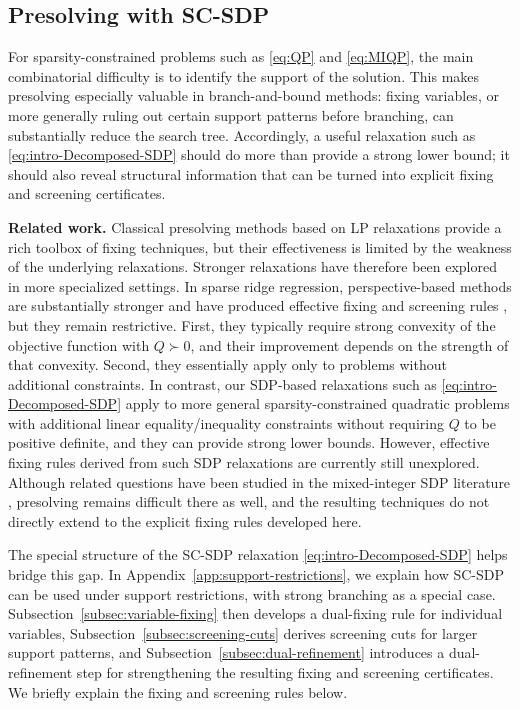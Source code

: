 \documentclass[11pt]{article}
\def\tb#1{\textbf{#1}}
\theoremstyle{plain}
\begin{document}
\subsection{Presolving with SC-SDP}


For sparsity-constrained problems such as \eqref{eq:QP} and \eqref{eq:MIQP}, the main combinatorial difficulty is to identify the support of the solution. This makes presolving especially valuable in branch-and-bound methods: fixing variables, or more generally ruling out 
certain support patterns before branching, can substantially reduce the search tree. Accordingly, a useful relaxation such as \eqref{eq:intro-Decomposed-SDP} should do more than provide a strong lower bound; it should also reveal structural information that can be turned into explicit fixing and screening certificates.

\medskip
\noindent\tb{Related work.}
Classical presolving methods based on LP relaxations \cite{achterberg2020presolve,gamrath2015progress} provide a rich toolbox of fixing techniques, but their effectiveness is limited by the weakness of the underlying relaxations. Stronger relaxations have therefore been explored in more specialized settings. In sparse ridge regression, perspective-based methods are substantially stronger and have produced effective fixing and screening rules \cite{atamturk2020safe,tan2025screening}, but they remain restrictive.
First, they typically require strong convexity of the objective function with $Q\succ 0$, and their improvement depends on the strength of that convexity. Second, they essentially apply only to problems without additional constraints. In contrast, our SDP-based relaxations such as \eqref{eq:intro-Decomposed-SDP} apply to more general sparsity-constrained quadratic problems 
with additional linear equality/inequality constraints without
requiring $Q$ to be positive definite, and they
can provide strong lower bounds. 
However, effective fixing rules derived from such SDP relaxations are 
currently still unexplored. Although related questions have been studied in the mixed-integer SDP literature \cite{gally2018framework,matter2023presolving}, presolving remains difficult there as well, and the resulting techniques do not directly extend to the explicit fixing rules developed here.

\medskip

The special structure of the SC-SDP relaxation \eqref{eq:intro-Decomposed-SDP} helps bridge this gap. In Appendix~\ref{app:support-restrictions}, we explain how SC-SDP can be used under support restrictions, with strong branching as a special case. Subsection~\ref{subsec:variable-fixing}
then develops a dual-fixing rule for individual variables, Subsection~\ref{subsec:screening-cuts} derives screening cuts for larger support patterns, and Subsection~\ref{subsec:dual-refinement} introduces a dual-refinement step for strengthening the resulting fixing and screening certificates. 
We briefly explain the fixing and screening rules below. 
\end{document}
